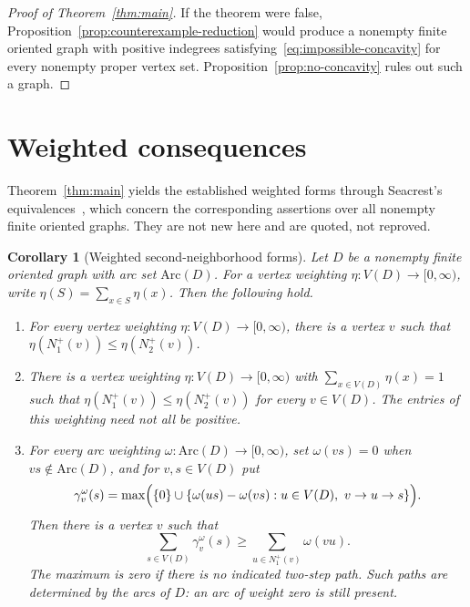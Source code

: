 \documentclass[11pt]{article}
\newtheorem{corollary}[theorem]{Corollary}
\theoremstyle{remark}
\begin{document}
\begin{proof}[Proof of Theorem~\ref{thm:main}]
If the theorem were false, Proposition~\ref{prop:counterexample-reduction}
would produce a nonempty finite oriented graph with positive indegrees
satisfying~\eqref{eq:impossible-concavity} for every nonempty proper vertex
set. Proposition~\ref{prop:no-concavity} rules out such a graph.
\end{proof}

\section{Weighted consequences}\label{sec:weighted-consequences}

Theorem~\ref{thm:main} yields the established weighted forms through
Seacrest's equivalences~\cite{Seacrest2015}, which concern the corresponding
assertions over all nonempty finite oriented graphs. They are not new here and
are quoted, not reproved.

\begin{corollary}[Weighted second-neighborhood forms]\label{cor:weighted-forms}
Let \(D\) be a nonempty finite oriented graph with arc set
\(\mathrm{Arc}(D)\). For a vertex weighting \(\eta:V(D)\to[0,\infty)\), write
\(\eta(S)=\sum_{x\in S}\eta(x)\). Then the following hold.
\begin{enumerate}[label=\textup{(\roman*)}]
\item For every vertex weighting \(\eta:V(D)\to[0,\infty)\), there is a
vertex \(v\) such that \(\eta(N_1^+(v))\leq\eta(N_2^+(v))\).
\item There is a vertex weighting \(\eta:V(D)\to[0,\infty)\) with
\(\sum_{x\in V(D)}\eta(x)=1\) such that
\(\eta(N_1^+(v))\leq\eta(N_2^+(v))\) for every \(v\in V(D)\).
The entries of this weighting need not all be positive.
\item For every arc weighting \(\omega:\mathrm{Arc}(D)\to[0,\infty)\), set
\(\omega(vs)=0\) when \(vs\notin\mathrm{Arc}(D)\), and for \(v,s\in V(D)\) put
\[
 \gamma_v^\omega(s)=\max\Bigl(\{0\}\cup
 \{\omega(us)-\omega(vs):u\in V(D),\ v\to u\to s\}\Bigr).
\]
Then there is a vertex \(v\) such that
\[
 \sum_{s\in V(D)}\gamma_v^\omega(s)\geq\sum_{u\in N_1^+(v)}\omega(vu).
\]
The maximum is zero if there is no indicated two-step path. Such paths are
determined by the arcs of \(D\): an arc of weight zero is still present.
\end{enumerate}
\end{corollary}
\end{document}
